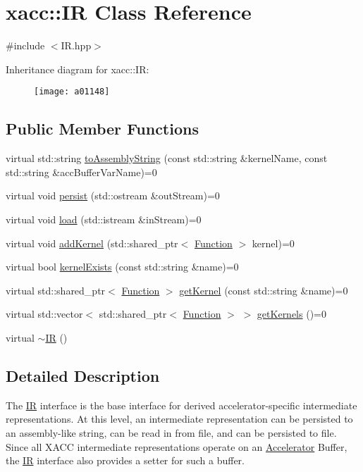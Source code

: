 \hypertarget{a01148}{}\section{xacc\+:\+:IR Class Reference}
\label{a01148}


{\ttfamily \#include $<$I\+R.\+hpp$>$}

Inheritance diagram for xacc\+:\+:IR\+:\begin{figure}[H]
\begin{center}
\leavevmode
\texttt{[image: a01148]}
\end{center}
\end{figure}
\subsection*{Public Member Functions}
\begin{DoxyCompactItemize}
\item 
virtual std\+::string \hyperlink{a01148_a8356cdff1919b88eabeb84fd7450cdb6}{to\+Assembly\+String} (const std\+::string \&kernel\+Name, const std\+::string \&acc\+Buffer\+Var\+Name)=0
\item 
virtual void \hyperlink{a01148_a414b72224d88473ad6190bb88102a3ea}{persist} (std\+::ostream \&out\+Stream)=0
\item 
virtual void \hyperlink{a01148_a444c2e4dc0faac500fb70fa93997e9bc}{load} (std\+::istream \&in\+Stream)=0
\item 
virtual void \hyperlink{a01148_abbbf8e6993c518597de32cd05d49d737}{add\+Kernel} (std\+::shared\+\_\+ptr$<$ \hyperlink{a01124}{Function} $>$ kernel)=0
\item 
virtual bool \hyperlink{a01148_afc9ccf5126f3fed19c2e879133b2f6d8}{kernel\+Exists} (const std\+::string \&name)=0
\item 
virtual std\+::shared\+\_\+ptr$<$ \hyperlink{a01124}{Function} $>$ \hyperlink{a01148_a6f49b4ba4b3a15142b04873284885f0d}{get\+Kernel} (const std\+::string \&name)=0
\item 
virtual std\+::vector$<$ std\+::shared\+\_\+ptr$<$ \hyperlink{a01124}{Function} $>$ $>$ \hyperlink{a01148_a88c50bfc5b279145360ddc0c3a703b9b}{get\+Kernels} ()=0
\item 
virtual \hyperlink{a01148_a09a76d71092254acae07e19fa2f34921}{$\sim$\+IR} ()
\end{DoxyCompactItemize}


\subsection{Detailed Description}
The \hyperlink{a01148}{IR} interface is the base interface for derived accelerator-\/specific intermediate representations. At this level, an intermediate representation can be persisted to an assembly-\/like string, can be read in from file, and can be persisted to file. Since all X\+A\+CC intermediate representations operate on an \hyperlink{a01084}{Accelerator} Buffer, the \hyperlink{a01148}{IR} interface also provides a setter for such a buffer. 

